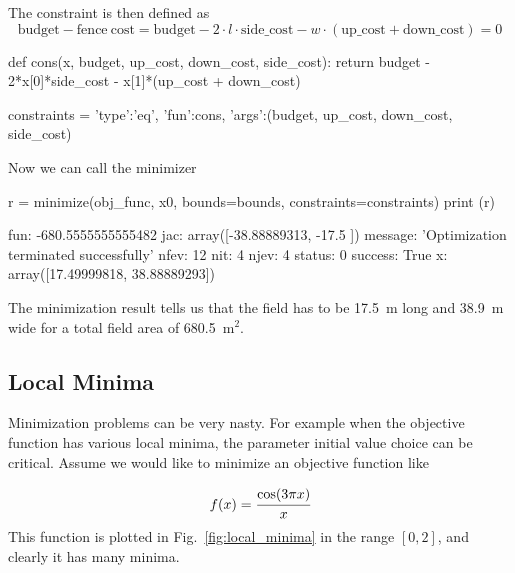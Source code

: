 The constraint is then defined as
\begin{equation*}
\mathrm{budget} - \mathrm{fence~cost} = \mathrm{budget} - 2\cdot l\cdot\mathrm{side\_cost} - w\cdot(\mathrm{up\_cost} + \mathrm{down\_cost}) = 0
\end{equation*}

\begin{ipython}
def cons(x, budget, up_cost, down_cost, side_cost):
    return budget - 2*x[0]*side_cost - x[1]*(up_cost + down_cost)

constraints = {'type':'eq', 'fun':cons,
               'args':(budget, up_cost, down_cost, side_cost)}
\end{ipython}
Now we can call the minimizer

\begin{ipython}
r = minimize(obj_func, x0, bounds=bounds, constraints=constraints)
print (r)
\end{ipython}
\begin{ioutput}
    fun: -680.5555555555482
    jac: array([-38.88889313, -17.5       ])
message: 'Optimization terminated successfully'
   nfev: 12
    nit: 4  
   njev: 4
 status: 0
success: True
      x: array([17.49999818, 38.88889293])
\end{ioutput}
The minimization result tells us that the field has to be 17.5~m long and 38.9~m wide for a total field area of 680.5~$\textrm{m}^2$.

\subsection{Local Minima}
Minimization problems can be very nasty.
For example when the objective function has various local minima, the parameter initial value choice can be critical. 
Assume we would like to minimize an objective function like 

\begin{equation*}
f(x) = \cfrac{\mathrm{cos}(3\pi x)}{x}
\end{equation*}
This function is plotted in Fig.~\ref{fig:local_minima} in the range $[0, 2]$, and clearly it has many minima. 


